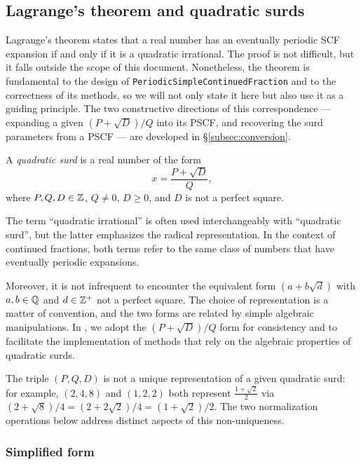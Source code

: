 \subsection{Lagrange's theorem and quadratic surds}

Lagrange's theorem states that a real number has an eventually periodic SCF expansion if and only 
if it is a quadratic irrational. The proof is not difficult, but it falls outside the scope of this 
document. Nonetheless, the theorem is fundamental to the design of \texttt{PeriodicSimpleContinuedFraction} 
and to the correctness of its methods, so we will not only state it here but also use it as a guiding principle.
The two constructive directions of this correspondence — expanding a given
$(P + \sqrt{D})/Q$ into its PSCF, and recovering the surd parameters from a PSCF — are
developed in \S\ref{subsec:conversion}.

\begin{definition}
  A \emph{quadratic surd} is a real number of the form
  \[
    x = \frac{P + \sqrt{D}}{Q},
  \]
  where $P, Q, D \in \mathbb{Z}$, $Q \neq 0$, $D \geq 0$, and $D$ is not a perfect square.
\end{definition}

\begin{remark}
  The term ``quadratic irrational'' is often used interchangeably with ``quadratic surd'', but the 
  latter emphasizes the radical representation. In the context of continued fractions, both 
  terms refer to the same class of numbers that have eventually periodic expansions.

  Moreover, it is not infrequent to encounter the equivalent form $(a + b\sqrt{d})$ with $a, b \in \mathbb{Q}$ 
  and $d \in \mathbb{Z}^+$ not a perfect square. The choice of representation is a matter of convention, 
  and the two forms are related by simple algebraic manipulations. In \catena, we adopt the $(P + \sqrt{D})/Q$ 
  form for consistency and to facilitate the implementation of methods that rely on the 
  algebraic properties of quadratic surds.
\end{remark}

The triple $(P, Q, D)$ is not a unique representation of a given quadratic surd: for example,
$(2, 4, 8)$ and $(1, 2, 2)$ both represent $\tfrac{1 + \sqrt{2}}{2}$ via
$(2 + \sqrt{8})/4 = (2 + 2\sqrt{2})/4 = (1 + \sqrt{2})/2$.
The two normalization operations below address distinct aspects of this non-uniqueness.

\subsubsection{Simplified form}

